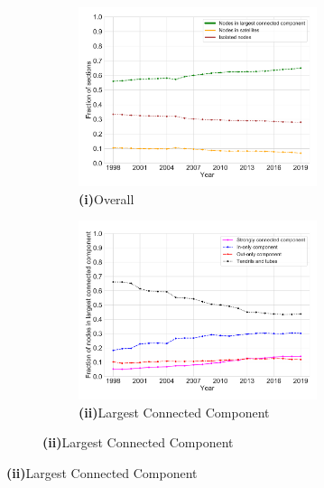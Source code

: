 \documentclass[varwidth, border=0pt]{standalone}
\begin{document}
\begin{figure}
\vspace*{6pt}

\begin{subfigure}{\linewidth}
	\begin{multicols}{2}
		\centering
		\begin{subfigure}{\linewidth}
			\includegraphics[width=\linewidth]{../../graphics/connectivity-development-de.pdf}
			\caption*{\textbf{\textsf{(i)}}\quad Overall}
		\end{subfigure}
		\newpage
		\begin{subfigure}{\linewidth}
			\includegraphics[width=\linewidth]{../../graphics/connectivity-lcc-de.pdf}
			\caption*{\textbf{\textsf{(ii)}}\quad Largest Connected Component}
		\end{subfigure}	
	\end{multicols}
	\vspace*{-6pt}
\end{subfigure}

	\end{figure}
	
\end{document}
